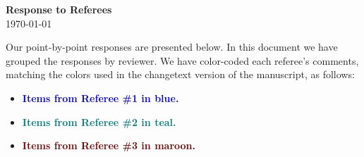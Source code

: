 \documentclass[11pt]{article}
\begin{document}
\newif\ifone
\newif\iftwo
\newif\ifthree
\newif\ifed
\newif\ifhlt

\onetrue %
\twotrue %
\threetrue %
\hlttrue  %

\ifone
\newcommand{\one}[2]{\textbf{\textcolor{blue}{ #1}}\\ \linebreak {#2}\\\noindent\rule{\textwidth}{1pt}\bigskip}
\else
\newcommand{\one}[2]{}
\fi

\iftwo
\newcommand{\two}[2]{\textbf{\textcolor{teal}{ #1}}\\ \linebreak {#2}\\\noindent\rule{\textwidth}{1pt}\bigskip}
\else
\newcommand{\two}[2]{}
\fi

\ifthree
\newcommand{\three}[2]{\textbf{\textcolor{Maroon}{ #1}}\\ \linebreak {#2}\\\noindent\rule{\textwidth}{1pt}\bigskip}
\else
\newcommand{\three}[2]{}
\fi

\ifed
\newcommand{\ed}[2]{\textbf{\textcolor{DarkOrchid}{Ed: #1}}\\ \linebreak {#2}\\\noindent\rule{\textwidth}{1pt}\bigskip}
\else
\newcommand{\ed}[2]{}
\fi

\ifhlt
\newcommand{\hlt}[1]{\hl{#1}}
\else
\newcommand{\hlt}[1]{{#1}}
\fi



\begin{center}
\textbf{\Large{Response to Referees}}\\
\smallskip
\today
\end{center} 
\medskip


Our point-by-point responses are presented below. In this document we have grouped the responses by reviewer.   We have color-coded each referee's comments, matching the colors used in the changetext version of the manuscript, as follows:

\begin{itemize}
\item \textbf{\textcolor{blue}{Items from Referee \#1 in blue.}}
\item \textbf{\textcolor{teal}{Items from Referee \#2 in teal.}}
\item \textbf{\textcolor{Maroon}{Items from Referee \#3 in maroon.}}
\end{itemize}
\end{document}
